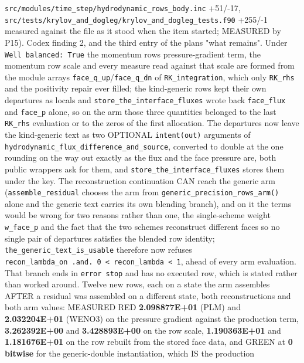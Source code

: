 \documentclass[english,a4paper]{my_memo}
\begin{document}
\begin{itemize}
  \texttt{src/modules/time\_step/hydrodynamic\_rows\_body.inc} +51/-17,
  \texttt{src/tests/krylov\_and\_dogleg/krylov\_and\_dogleg\_tests.f90} +255/-1 measured
  against the file as it stood when the item started; MEASURED by P15). Codex
  finding 2, and the third entry of the plan\textquotesingle s "what remains". Under
  \texttt{Well\ balanced:\ True} the momentum row\textquotesingle s pressure-gradient term, the momentum
  row scale and every measure read against that scale are formed from the
  module arrays \texttt{face\_q\_up}/\texttt{face\_q\_dn} of \texttt{RK\_integration}, which only
  \texttt{RK\_rhs} and the positivity repair ever filled; the kind-generic rows kept
  their own departures as locals and \texttt{store\_the\_interface\_fluxes} wrote back
  \texttt{face\_flux} and \texttt{face\_p} alone, so on the arm those three quantities belonged
  to the last \texttt{RK\_rhs} evaluation or to the zeros of the first allocation.
  The departures now leave the kind-generic text as two OPTIONAL \texttt{intent(out)}
  arguments of \texttt{hydrodynamic\_flux\_difference\_and\_source}, converted to double
  at the one rounding on the way out exactly as the flux and the face pressure
  are, both public wrappers ask for them, and \texttt{store\_the\_interface\_fluxes}
  stores them under the key. The reconstruction continuation CAN reach the
  generic arm (\texttt{assemble\_residual} chooses the arm from
  \texttt{generic\_precision\_rows\_arm()} alone and the generic text carries its own
  blending branch), and on it the terms would be wrong for two reasons rather
  than one, the single-scheme weight \texttt{w\_face\_p} and the fact that the two
  schemes reconstruct different faces so no single pair of departures satisfies
  the blended row identity; \texttt{the\_generic\_text\_is\_usable} therefore now refuses
  \texttt{recon\_lambda\_on\ .and.\ 0\ \textless{}\ recon\_lambda\ \textless{}\ 1}, ahead of every arm evaluation.
  That branch ends in \texttt{error\ stop} and has no executed row, which is stated
  rather than worked around. Twelve new rows, each on a state the arm assembles
  AFTER a residual was assembled on a different state, both reconstructions and
  both arm values: MEASURED RED \textbf{2.098877E+01} (PLM) and \textbf{2.032204E+01}
  (WENO3) on the pressure gradient against the production term,
  \textbf{3.262392E+00} and \textbf{3.428893E+00} on the row scale, \textbf{1.190363E+01} and
  \textbf{1.181676E+01} on the row rebuilt from the stored face data, and GREEN at
  \textbf{0 bitwise} for the generic-double instantiation, which IS the production

\end{itemize}
\end{document}

